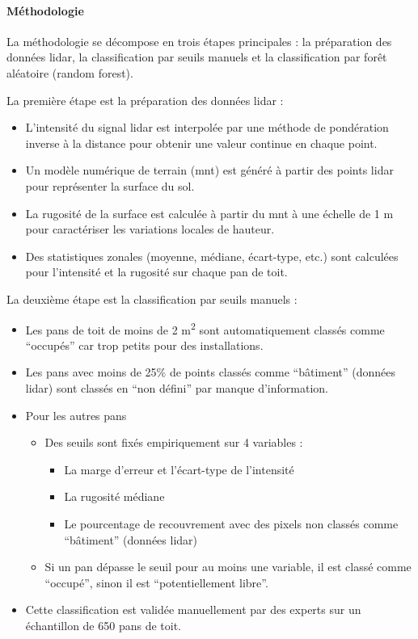 \paragraph{Méthodologie}
\par{La méthodologie se décompose en trois étapes principales : la préparation des données \gls{lidar}, la classification par seuils manuels et la classification par forêt aléatoire (random forest).}
\par{La première étape est la préparation des données \gls{lidar} :}
\begin{itemize}
    \item L'intensité du signal \gls{lidar} est interpolée par une méthode de pondération inverse à la distance pour obtenir une valeur continue en chaque point.
    \item Un modèle numérique de terrain (\acrshort{mnt}) est généré à partir des points \gls{lidar} pour représenter la surface du sol.
    \item La rugosité de la surface est calculée à partir du \acrshort{mnt} à une échelle de 1 m pour caractériser les variations locales de hauteur.
    \item Des statistiques zonales (moyenne, médiane, écart-type, etc.) sont calculées pour l'intensité et la rugosité sur chaque pan de toit.
\end{itemize}
\par{La deuxième étape est la classification par seuils manuels :}
\begin{itemize}
    \item Les pans de toit de moins de 2 \si{\unit{m^2}} sont automatiquement classés comme ``occupés'' car trop petits pour des installations.
    \item Les pans avec moins de 25\% de points classés comme ``bâtiment'' (données \gls{lidar}) sont classés en ``non défini'' par manque d'information.
    \item Pour les autres pans
    \begin{itemize}
        \item Des seuils sont fixés empiriquement sur 4 variables :
        \begin{itemize}
            \item La marge d'erreur et l'écart-type de l'intensité
            \item La rugosité médiane
            \item Le pourcentage de recouvrement avec des pixels non classés comme ``bâtiment'' (données \gls{lidar})
        \end{itemize}
        \item Si un pan dépasse le seuil pour au moins une variable, il est classé comme ``occupé'', sinon il est ``potentiellement libre''.
    \end{itemize}
    \item Cette classification est validée manuellement par des experts sur un échantillon de 650 pans de toit.
\end{itemize}

